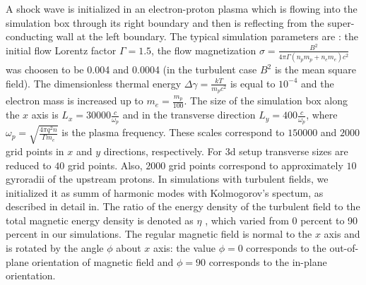 \documentclass[a4paper]{jpconf}
\begin{document}
	A shock wave is initialized in an electron-proton plasma which is flowing into the simulation box through its right boundary and then is reflecting from the super-conducting wall at the left boundary.  The typical simulation parameters are : the initial flow Lorentz factor $\Gamma = 1.5$, the flow magnetization $\sigma = \frac{B^2}{4\pi\Gamma (n_p m_p + n_e m_e) c^2}$ was choosen to be  0.004 and 0.0004  (in the turbulent case $B^2$ is the mean square field). The dimensionless thermal energy $\Delta \gamma = \frac{k T}{m_p c^2}$ is equal to $10^{-4}$ and the electron mass is increased up to $m_e = \frac{m_p}{100}$. The size of the simulation box along the $x$ axis is $L_x = 30000\frac{c}{\omega_p}$ and in the transverse direction $L_y = 400\frac{c}{\omega_p}$, where $\omega_p = \sqrt{\frac{4\pi q^2 n}{\Gamma m_e}}$ is the plasma frequency. These scales correspond to $150000$ and $2000$ grid points in $x$ and $y$ directions, respectively. For 3d setup transverse sizes are reduced to $40$ grid points. Also, $2000$ grid points correspond to approximately $10$ gyroradii of the upstream protons.
	In simulations with turbulent fields, we initialized it as  summ of harmonic modes with Kolmogorov's spectum, as described in detail in\cite{Romansky2019}. The ratio of the energy density of the turbulent field to the total magnetic energy density is denoted as $\eta$ , which varied from 0 percent to 90 percent in our simulations. The regular magnetic field is normal to the $x$ axis and is rotated by the angle $\phi$ about $x$ axis: the value $\phi = 0$ corresponds to the out-of-plane orientation of magnetic field and $\phi = 90$ corresponds to the in-plane orientation.
	
	
	
\end{document}
